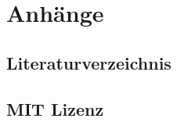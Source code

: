 \documentclass[ngerman,a4paper,headsepline,11pt,twoside,DIV=12,BCOR=15mm]{scrbook}
\begin{document}
	
	
	
	
	
	
	
	
	
	\part*{Anhänge}
	\appendix
	\chapter{Literaturverzeichnis}
	\printbibliography[heading=none]
	\chapter{MIT Lizenz}
	
\end{document}
